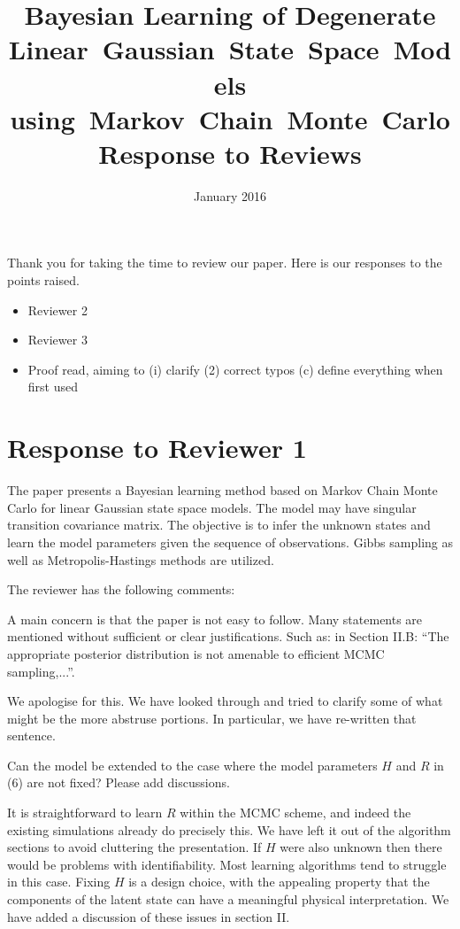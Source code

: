 \documentclass{article}
\title{Bayesian Learning of Degenerate Linear~Gaussian~State~Space~Models using~Markov~Chain~Monte~Carlo \\ Response to Reviews}
\date{January 2016}
\newenvironment{review}[0]{\begin{itshape}\color{Gray}\noindent}{\end{itshape}\vspace{0.4cm}}
\newenvironment{response}[0]{\noindent}{\vspace{0.4cm}}
\newcommand{\meta}[1]{{\color{red}\em #1}}
\begin{document}
\maketitle

Thank you for taking the time to review our paper. Here is our responses to the points raised.

\meta{
\begin{itemize}
 \item Reviewer 2
 \item Reviewer 3
 \item Proof read, aiming to (i) clarify (2) correct typos (c) define everything when first used
\end{itemize}

}

\section*{Response to Reviewer 1}

\begin{review}
The paper presents a Bayesian learning method based on Markov Chain Monte Carlo for linear Gaussian state space models. The model may have singular transition covariance matrix. The objective is to infer the unknown states and learn the model parameters given the sequence of observations. Gibbs sampling as well as Metropolis-Hastings methods are utilized.

The reviewer has the following comments:

A main concern is that the paper is not easy to follow. Many statements are mentioned without sufficient or clear justifications. Such as: in Section II.B: ``The appropriate posterior distribution is not amenable to efficient MCMC sampling,...''.
\end{review}

\begin{response}
 We apologise for this. We have looked through and tried to clarify some of what might be the more abstruse portions. In particular, we have re-written that sentence.
\end{response}

\begin{review}
Can the model be extended to the case where the model parameters $H$ and $R$ in (6) are not fixed? Please add discussions.
\end{review}

\begin{response}
 It is straightforward to learn $R$ within the MCMC scheme, and indeed the existing simulations already do precisely this. We have left it out of the algorithm sections to avoid cluttering the presentation. If $H$ were also unknown then there would be problems with identifiability. Most learning algorithms tend to struggle in this case. Fixing $H$ is a design choice, with the appealing property that the components of the latent state can have a meaningful physical interpretation. We have added a discussion of these issues in section II.
\end{response}
\end{document}
